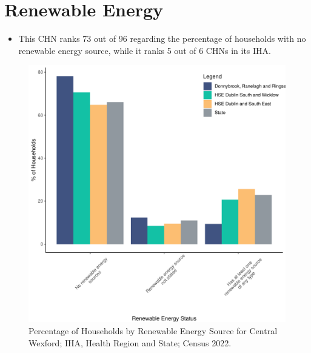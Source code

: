 \documentclass{article}
\begin{document}
\section{Renewable Energy}\label{sect:RE}
\begin{itemize}
\item This CHN ranks  73 out of 96 regarding the percentage of households with no renewable energy source, while it ranks   5 out of 6 CHNs in its IHA.
\end{itemize}
\begin{figure}[H]
	\centering
	\includegraphics[width = 140mm]{../figures/RenewableEnergyED.pdf}
	\caption{Percentage of Households by Renewable Energy Source for Central Wexford; IHA, Health Region and State; Census 2022.}
	\label{fig:vbnv}
	\end{figure}
\end{document}
